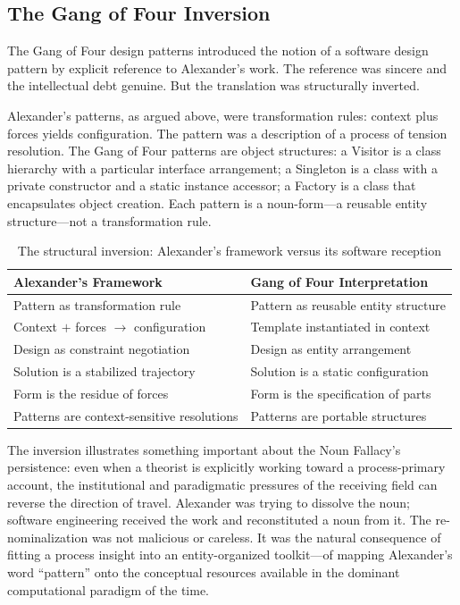 \documentclass[12pt, a4paper]{article}
\theoremstyle{plain}
\theoremstyle{definition}
\theoremstyle{remark}
\begin{document}
\subsection{The Gang of Four Inversion}

The Gang of Four design patterns \citep{gamma1994} introduced the notion
of a software design pattern by explicit reference to Alexander's work.
The reference was sincere and the intellectual debt genuine. But the
translation was structurally inverted.

Alexander's patterns, as argued above, were transformation rules: context
plus forces yields configuration. The pattern was a description of a process
of tension resolution. The Gang of Four patterns are object structures:
a Visitor is a class hierarchy with a particular interface arrangement; a
Singleton is a class with a private constructor and a static instance
accessor; a Factory is a class that encapsulates object creation. Each
pattern is a noun-form---a reusable entity structure---not a transformation
rule.

\begin{table}[h]
\centering
\caption{The structural inversion: Alexander's framework versus its software reception}
\begin{tabular}{p{} p{}}
\toprule
\textbf{Alexander's Framework} & \textbf{Gang of Four Interpretation} \\
\midrule
Pattern as transformation rule & Pattern as reusable entity structure \\
Context $+$ forces $\to$ configuration & Template instantiated in context \\
Design as constraint negotiation & Design as entity arrangement \\
Solution is a stabilized trajectory & Solution is a static configuration \\
Form is the residue of forces & Form is the specification of parts \\
Patterns are context-sensitive resolutions & Patterns are portable structures \\
\bottomrule
\end{tabular}
\label{tab:alexander}
\end{table}

The inversion illustrates something important about the Noun Fallacy's
persistence: even when a theorist is explicitly working toward a
process-primary account, the institutional and paradigmatic pressures of
the receiving field can reverse the direction of travel. Alexander was
trying to dissolve the noun; software engineering received the work and
reconstituted a noun from it. The re-nominalization was not malicious or
careless. It was the natural consequence of fitting a process insight into
an entity-organized toolkit---of mapping Alexander's word ``pattern'' onto
the conceptual resources available in the dominant computational paradigm
of the time.
\end{document}
